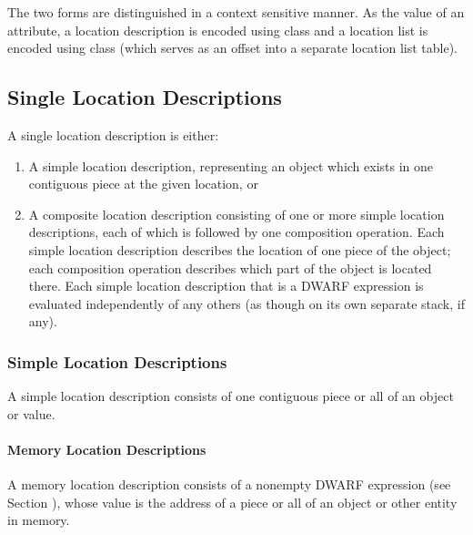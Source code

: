 The two forms are distinguished in a context sensitive
manner. As the value of an attribute, a location description
is encoded using 
class   
and a location list is encoded
using class 
(which 
serves as an offset into a
separate 
location list table).


\subsection{Single Location Descriptions}
A single location description is either:

\begin{enumerate}[1]
\item A simple location description, representing an object
which exists in one contiguous piece at the given location, or 
\item A composite location description consisting of one or more
simple location descriptions, each of which is followed by
one composition operation. Each simple location description
describes the location of one piece of the object; each
composition operation describes which part of the object is
located there. Each simple location description that is a
DWARF expression is evaluated independently of any others
(as though on its own separate stack, if any). 
\end{enumerate}



\subsubsection{Simple Location Descriptions}

A 
simple location description consists of one 
contiguous piece or all of an object or value.


\paragraph{Memory Location Descriptions}

A 
memory location description 
consists of a non\dash empty DWARF
expression (see 
Section 
), whose value is the address of
a piece or all of an object or other entity in memory.

